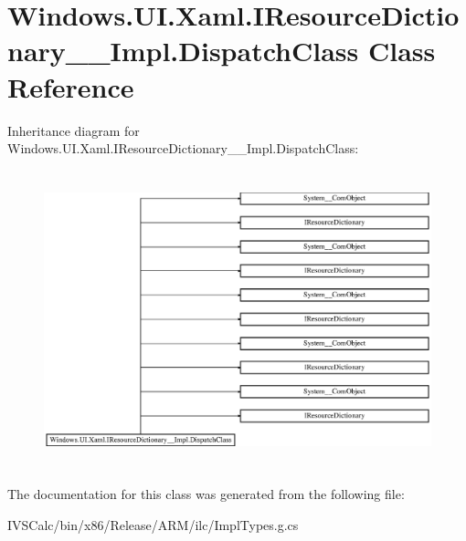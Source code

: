 \hypertarget{class_windows_1_1_u_i_1_1_xaml_1_1_i_resource_dictionary_____impl_1_1_dispatch_class}{}\section{Windows.\+U\+I.\+Xaml.\+I\+Resource\+Dictionary\+\_\+\+\_\+\+Impl.\+Dispatch\+Class Class Reference}
\label{class_windows_1_1_u_i_1_1_xaml_1_1_i_resource_dictionary_____impl_1_1_dispatch_class}
Inheritance diagram for Windows.\+U\+I.\+Xaml.\+I\+Resource\+Dictionary\+\_\+\+\_\+\+Impl.\+Dispatch\+Class\+:\begin{figure}[H]
\begin{center}
\leavevmode
\includegraphics[height=8.651686cm]{class_windows_1_1_u_i_1_1_xaml_1_1_i_resource_dictionary_____impl_1_1_dispatch_class}
\end{center}
\end{figure}


The documentation for this class was generated from the following file\+:\begin{DoxyCompactItemize}
\item 
I\+V\+S\+Calc/bin/x86/\+Release/\+A\+R\+M/ilc/Impl\+Types.\+g.\+cs\end{DoxyCompactItemize}
